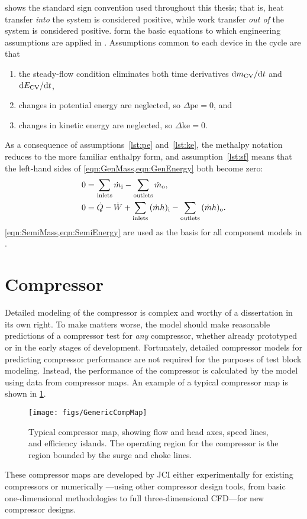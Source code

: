  shows the standard sign convention used throughout this thesis; 
that is, heat transfer \emph{into} the system is considered positive, 
while work transfer \emph{out of} the system is considered positive.
 form the basic equations to which 
engineering assumptions are applied in .
Assumptions common to each device in the cycle are that
\begin{enumerate}
  \item the steady-flow condition eliminates both time derivatives $\mathop{}\!\mathrm{d}{m_{\mathrm{CV}}}/\!\mathop{}\!\mathrm{d}{t}$ and $\mathop{}\!\mathrm{d}{E_{\mathrm{CV}}}/\!\mathop{}\!\mathrm{d}{t}$, \label{lst:sf}
  \item changes in potential energy are neglected, so $\Delta \text{pe} = 0$, and \label{lst:pe}
  \item changes in kinetic energy are neglected, so $\Delta \text{ke} = 0$. \label{lst:ke}
\end{enumerate}
As a consequence of assumptions~\ref{lst:pe} and~\ref{lst:ke},
the methalpy notation reduces to the more familiar enthalpy form,
and assumption~\ref{lst:sf} means that the left-hand sides of \cref{eqn:GenMass,eqn:GenEnergy} both become zero:
\begin{align}
  0 &= \sum_{\text{inlets}}{\dot{m}_{\text{i}}} - \sum_{\text{outlets}}{\dot{m}_{\text{o}}}, \label{eqn:SemiMass}\\
  0 &= \dot{Q} - \dot{W} + \sum_{\text{inlets}}{(\dot{m}h)_{\text{i}}} - \sum_{\text{outlets}}{(\dot{m}h)_{\text{o}}}. \label{eqn:SemiEnergy}
\end{align}
\cref{eqn:SemiMass,eqn:SemiEnergy} are used as the basis for all component models
in .

\section{Compressor} \label{sec:Compressor}
Detailed modeling of the compressor is complex and worthy of a dissertation in its own right. 
To make matters worse, the model should make reasonable predictions 
of a compressor test for \emph{any} compressor, 
whether already prototyped or in the early stages of development.
Fortunately, detailed compressor models 
for predicting compressor performance are not required for the purposes of test block modeling. 
Instead, the performance of the compressor is calculated by the model using
data from compressor maps. 
An example of a typical compressor map is shown in \cref{fig:GenMap}. 
\begin{figure}[tbp]
  \centering
  \texttt{[image: figs/GenericCompMap]}
  \caption{Typical compressor map, showing flow and head axes, speed lines, and efficiency islands.
    The operating region for the compressor is the region bounded by the surge and choke lines.}
  \label{fig:GenMap}
\end{figure}
These compressor maps are developed by JCI either 
experimentally for existing compressors or numerically%
---using other compressor design tools, from basic one-dimensional methodologies
to full three-dimensional CFD---for new compressor designs.

